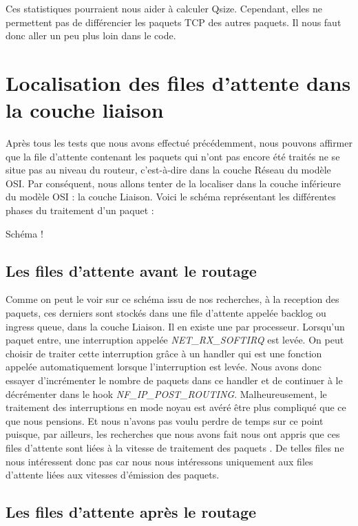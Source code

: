 \documentclass[a4paper]{article}
\begin{document}
Ces statistiques pourraient nous aider à calculer Qsize. Cependant,
elles ne permettent pas de différencier les paquets TCP des autres paquets.
Il nous faut donc aller un peu plus loin dans le code.

\section{Localisation des files d'attente dans la couche liaison}

Après tous les tests que nous avons effectué précédemment, nous pouvons affirmer
 que la file d'attente contenant les paquets qui n'ont pas encore été traités ne
  se situe pas au niveau du routeur, c'est-à-dire dans la couche Réseau du modèle 
  OSI. Par conséquent, nous allons tenter de la localiser dans la couche
   inférieure du modèle OSI : la couche Liaison. Voici le schéma représentant
    les différentes phases du traitement d'un paquet :

Schéma !

\subsection{Les files d'attente avant le routage}
Comme on peut le voir sur ce schéma issu de nos recherches, à la reception des paquets, ces derniers sont stockés dans une file d'attente appelée backlog \cite{10poin} ou ingress queue, dans la couche Liaison. Il en existe une par processeur. 
Lorsqu'un paquet entre, une interruption appelée \textit{NET\_RX\_SOFTIRQ} est levée. On peut choisir de traiter cette interruption grâce à un handler qui est une fonction appelée automatiquement lorsque l'interruption est levée. Nous avons donc essayer d'incrémenter le nombre de paquets dans ce handler et de continuer à le décrémenter  dans le hook \textit{NF\_IP\_POST\_ROUTING}. Malheureusement, le traitement des interruptions en mode noyau est avéré être plus compliqué que ce que nous pensions. Et nous n'avons pas voulu perdre de temps sur ce point puisque, par ailleurs, les recherches que nous avons fait nous ont appris que ces files d'attente sont liées à la vitesse de traitement des paquets \cite{journey} \cite{bookin}. De telles files ne nous intéressent donc pas car nous nous intéressons uniquement aux files d'attente liées aux vitesses d'émission des paquets. 

\subsection{Les files d'attente après le routage}
\end{document}
